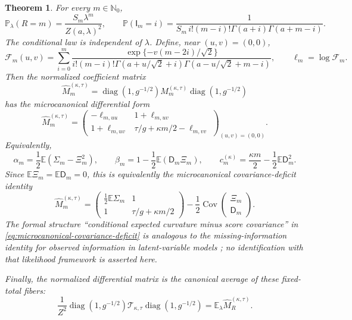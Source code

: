 \documentclass[11pt,a4paper]{amsart}
\numberwithin{equation}{section}
\theoremstyle{plain}
\newtheorem{theorem}{Theorem}[section]
\theoremstyle{definition}
\newcommand{\E}{\mathbb E}
\newcommand{\N}{\mathbb N}
\newcommand{\Dfin}{\mathsf D}
\newcommand{\diag}{\operatorname{diag}}
\newcommand{\Turan}{\mathcal T}
\begin{document}
\begin{theorem}\label{thm:ensemble-hierarchy}
For every \(m\in\N_0\),
\begin{equation}\label{eq:pair-total-law}
 \mathbb P_\lambda(R=m)=\frac{S_m\lambda^m}{Z(a,\lambda)^2},
 \qquad
 \mathbb P(\mathsf I_m=i)
 =\frac{1}{S_m\,i!(m-i)!\Gamma(a+i)\Gamma(a+m-i)}.
\end{equation}
The conditional law is independent of \(\lambda\).  Define, near
\((u,v)=(0,0)\),
\[
 \mathcal F_m(u,v)
 =\sum_{i=0}^m
 \frac{\exp\{-v(m-2i)/\sqrt2\}}
 {i!(m-i)!\Gamma(a+u/\sqrt2+i)
  \Gamma(a-u/\sqrt2+m-i)},
 \qquad
 \ell_m=\log\mathcal F_m.
\]
Then the normalized coefficient matrix
\[
 \widehat M_m^{(\kappa,\tau)}
 =\diag(1,g^{-1/2})M_m^{(\kappa,\tau)}\diag(1,g^{-1/2})
\]
has the microcanonical differential form
\begin{equation}\label{eq:microcanonical-schur}
 \widehat M_m^{(\kappa,\tau)}
 =\begin{pmatrix}
  -\ell_{m,uu}&1+\ell_{m,uv}\\
  1+\ell_{m,uv}&\tau/g+\kappa m/2-\ell_{m,vv}
 \end{pmatrix}_{(u,v)=(0,0)}.
\end{equation}
Equivalently,
\begin{equation}\label{eq:finite-law-entries}
 \alpha_m=\frac12\E(\Sigma_m-\Xi_m^2),\qquad
 \beta_m=1-\frac12\E(\Dfin_m\Xi_m),\qquad
 c_m^{(\kappa)}=\frac{\kappa m}{2}-\frac12\E\Dfin_m^2.
\end{equation}
Since \(\E\Xi_m=\E\Dfin_m=0\), this is equivalently the microcanonical
covariance-deficit identity
\begin{equation}\label{eq:microcanonical-covariance-deficit}
 \widehat M_m^{(\kappa,\tau)}
 =\begin{pmatrix}
   \frac12\E\Sigma_m&1\\
   1&\tau/g+\kappa m/2
  \end{pmatrix}
  -\frac12\operatorname{Cov}\!\begin{pmatrix}\Xi_m\\ \Dfin_m\end{pmatrix}.
\end{equation}
The formal structure ``conditional expected curvature minus score covariance''
in \eqref{eq:microcanonical-covariance-deficit} is analogous to the
missing-information identity for observed information in latent-variable
models \cite{Louis1982ObservedInformation}; no identification with that
likelihood framework is asserted here.

Finally, the normalized differential matrix is the canonical average of these
fixed-total fibers:
\begin{equation}\label{eq:canonical-fiber-average}
 \frac1{Z^2}\diag(1,g^{-1/2})
 \Turan_{\kappa,\tau}
 \diag(1,g^{-1/2})
 =\E_\lambda\widehat M_R^{(\kappa,\tau)}.
\end{equation}
\end{theorem}
\end{document}
